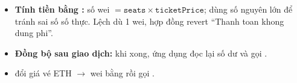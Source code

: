 \begin{itemize}[leftmargin=1.5em]
    \item \textbf{Tính tiền bằng :} số wei $=\texttt{seats}\times\texttt{ticketPrice}$; dùng số nguyên lớn để tránh sai số số thực.
          Lệch dù 1 wei, hợp đồng revert ``Thanh toan khong dung phi''.
    \item \textbf{Đồng bộ sau giao dịch:} khi  xong, ứng dụng đọc lại số dư và gọi .
    \item {} đổi giá vé ETH $\to$ wei bằng  rồi gọi .
\end{itemize}
